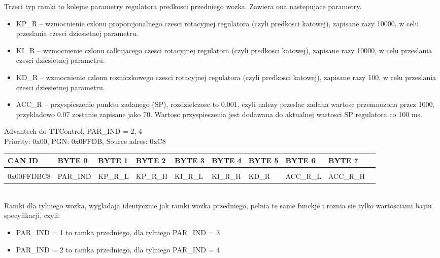 \documentclass{article}
\begin{document}
Trzeci typ ramki to kolejne parametry regulatora predkosci przedniego wozka. Zawiera ona nastepujace parametry. 
\begin{itemize}
    \item KP\_R -- wzmocnienie czlonu proporcjonalnego czesci rotacyjnej regulatora (czyli predkosci katowej), zapisane razy 10000, w celu przeslania czesci dziesietnej parametru.
    \item KI\_R -- wzmocnienie czlonu calkujacego czesci rotacyjnej regulatora (czyli predkosci katowej), zapisane razy 10000, w celu przeslania czesci dziesietnej parametru.
    \item KD\_R -- wzmocnienie czlonu rozniczkowego czesci rotacyjnej regulatora (czyli predkosci katowej), zapisane razy 100, w celu przeslania czesci dziesietnej parametru.
    \item ACC\_R -- przyspieszenie punktu zadanego (SP), rozdzielczosc to 0.001, czyli nalezy przeslac zadana wartosc przemnozona przez 1000, przykladowo 0.07 zostanie zapisane jako 70. Wartosc przyspieszenia jest dodawana do aktualnej wartosci SP regulatora co 100 ms.
\end{itemize}

Advantech do TTControl, PAR\_IND  = 2, 4\\
Priority: 0x00, PGN: 0x0FFDB, Source adres: 0xC8 \\
\begin{left}
\begin{tabular}{ |p{2cm}|p{1.35cm}|p{1.2cm}|p{1.50cm}|p{1.50cm}|p{1.35cm}|p{1.4cm}|p{1.4cm}|p{1.35cm}|p{1.35cm}|} 
 \hline
 CAN ID & BYTE 0 & BYTE 1 & BYTE 2 & BYTE 3 & BYTE 4 & BYTE 5 & BYTE 6 & BYTE 7 \\ \hline
 & & & & & & & &\\
0x00FFDBC8 & PAR\_IND & KP\_R\_L & KP\_R\_H & KI\_R\_L & KI\_R\_H & KD\_R & ACC\_R\_L & ACC\_R\_H \\
 \hline
\end{tabular}
\end{left}\\

Ramki dla tylniego wozka, wygladaja identycznie jak ramki wozka przedniego, pelnia te same funckje i roznia sie tylko wartosciami bajtu specyfikacji, czyli: 
\begin{itemize}
    \item PAR\_IND  = 1 to ramka przedniego, dla tylniego PAR\_IND  = 3
    \item PAR\_IND  = 2 to ramka przedniego, dla tylniego PAR\_IND  = 4
\end{itemize}
\end{document}
